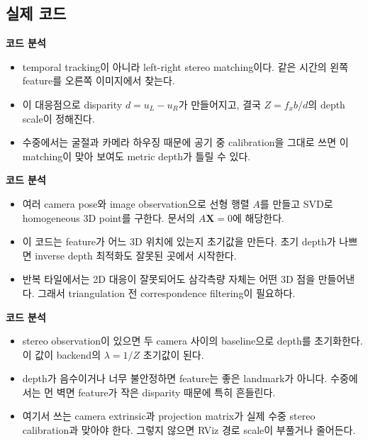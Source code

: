 \documentclass[11pt,a4paper]{article}
\newcommand{\codeheading}[1]{\par\vspace{6pt}\noindent{\footnotesize\bfseries\textcolor{codeemph}{#1}}\par\vspace{2pt}}
\newcommand{\readpoint}[1]{\par\noindent{\footnotesize\textcolor{muted}{읽는 포인트: #1}}\par\vspace{2pt}}
\newenvironment{codeanalysis}{%
  \par\vspace{2pt}\noindent
  {\footnotesize\bfseries\textcolor{accentblue}{코드 분석}}\par
  \begin{itemize}[leftmargin=1.35em,topsep=2pt,itemsep=1pt,parsep=0pt]
  \footnotesize
}{%
  \end{itemize}
  \vspace{6pt}
}
\begin{document}
\subsection*{실제 코드}

\readpoint{left image에서 찾은 feature를 right image로 다시 KLT 추적해서 stereo correspondence를 만든다.}
\codeheading{feature\_tracker.cpp:216--221}

\begin{codeanalysis}
  \item temporal tracking이 아니라 left-right stereo matching이다. 같은 시간의 왼쪽 feature를 오른쪽 이미지에서 찾는다.
  \item 이 대응점으로 disparity \(d=u_L-u_R\)가 만들어지고, 결국 \(Z=f_xb/d\)의 depth scale이 정해진다.
  \item 수중에서는 굴절과 카메라 하우징 때문에 공기 중 calibration을 그대로 쓰면 이 matching이 맞아 보여도 metric depth가 틀릴 수 있다.
\end{codeanalysis}

\codeheading{feature\_manager.cpp:198--212}

\begin{codeanalysis}
  \item 여러 camera pose와 image observation으로 선형 행렬 \(A\)를 만들고 SVD로 homogeneous 3D point를 구한다. 문서의 \(A\mathbf{X}=0\)에 해당한다.
  \item 이 코드는 feature가 어느 3D 위치에 있는지 초기값을 만든다. 초기 depth가 나쁘면 inverse depth 최적화도 잘못된 곳에서 시작한다.
  \item 반복 타일에서는 2D 대응이 잘못되어도 삼각측량 자체는 어떤 3D 점을 만들어낸다. 그래서 triangulation 전 correspondence filtering이 필요하다.
\end{codeanalysis}

\codeheading{feature\_manager.cpp:302--340}

\begin{codeanalysis}
  \item stereo observation이 있으면 두 camera 사이의 baseline으로 depth를 초기화한다. 이 값이 backend의 \(\lambda=1/Z\) 초기값이 된다.
  \item depth가 음수이거나 너무 불안정하면 feature는 좋은 landmark가 아니다. 수중에서는 먼 벽면 feature가 작은 disparity 때문에 특히 흔들린다.
  \item 여기서 쓰는 camera extrinsic과 projection matrix가 실제 수중 stereo calibration과 맞아야 한다. 그렇지 않으면 RViz 경로 scale이 부풀거나 줄어든다.
\end{codeanalysis}
\end{document}
